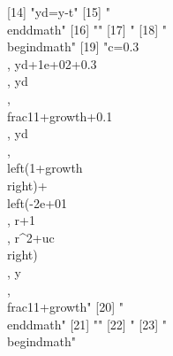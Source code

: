 [14] "{yd}={y}-{t}"                                                                                                                                                                      
[15] "\\end{dmath}"                                                                                                                                                                      
[16] ""                                                                                                                                                                                  
[17] "%
[18] "\\begin{dmath}"                                                                                                                                                                    
[19] "{c}=0.3\\, {yd}+1e+02+0.3\\, {yd}\\, \\frac{1}{1+{growth}}+0.1\\, {yd}\\, \\left(1+{growth}\\right)+\\left(-2e+01\\, {r}+1\\, {r}^{2}+{uc}\\right)\\, {y}\\, \\frac{1}{1+{growth}}"
[20] "\\end{dmath}"                                                                                                                                                                      
[21] ""                                                                                                                                                                                  
[22] "%
[23] "\\begin{dmath}"                                                                                                                                                                    
